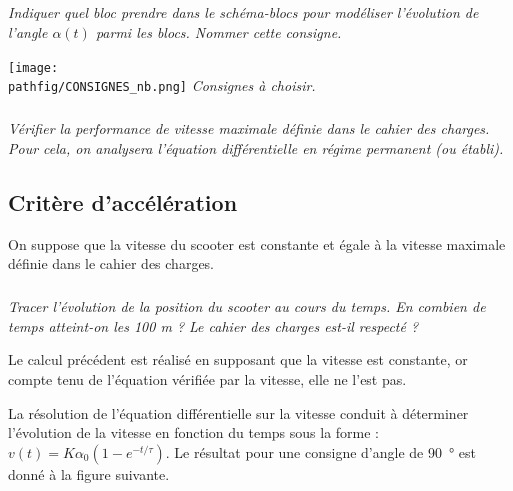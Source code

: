 \documentclass[10pt,fleqn]{article} %
\begin{document}
\begin{multicols}{2}
\subparagraph{}\textit{Indiquer quel bloc prendre dans le schéma-blocs pour modéliser l'évolution de l'angle $\alpha(t)$ parmi les blocs. Nommer cette consigne.}

\begin{center}
\texttt{[image: \\pathfig/CONSIGNES\_nb.png]}
\textit{Consignes à choisir.}
\end{center}


\subparagraph{}\textit{Vérifier la performance de vitesse maximale définie dans le cahier des charges. Pour cela, on analysera l'équation différentielle en régime permanent (ou établi).}


\subsection*{Critère d'accélération}


On suppose que la vitesse du scooter est constante et égale à la vitesse maximale définie dans le cahier des charges.

\subparagraph{}\textit{Tracer l'évolution de la position du scooter au cours du temps. En combien de temps atteint-on les 100 m ?  Le cahier des charges est-il respecté ?}


Le calcul précédent est réalisé en supposant que la vitesse est constante, or compte tenu de l'équation vérifiée par la vitesse, elle ne l'est pas.

La résolution de l'équation différentielle sur la vitesse conduit à déterminer l'évolution de la vitesse en fonction du temps sous la forme : $v(t)=K\alpha_0(1-e^{-t/\tau})$. Le résultat pour une consigne d'angle de \SI{90}{\degree} est donné à la figure suivante.%





\end{multicols}
\end{document}
